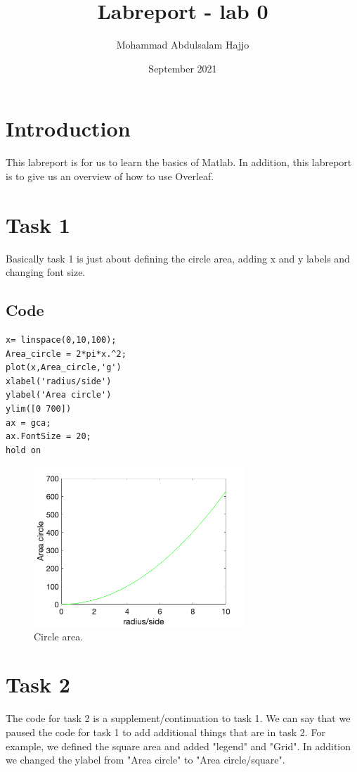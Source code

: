 \documentclass{article}
\title{Labreport - lab 0}
\author{Mohammad Abdulsalam Hajjo}
\affil{Perspectives on Computer Science and Engineering, mohhaj21@student.hh.se}
\date{September 2021}
\begin{document}
\maketitle

\section{Introduction}
This labreport is for us to learn the basics of Matlab. In addition, this labreport is to give us an overview of how to use Overleaf. 

\section{Task 1}
Basically task 1 is just about defining the circle area, adding x and y labels and changing font size. 
\subsection{Code}
\begin{tcolorbox}
\begin{verbatim}
x= linspace(0,10,100);
Area_circle = 2*pi*x.^2;
plot(x,Area_circle,'g')
xlabel('radius/side')
ylabel('Area circle')
ylim([0 700])
ax = gca;
ax.FontSize = 20;
hold on   
\end{verbatim}
\end{tcolorbox} 


\begin{figure}[H]
\centering
\includegraphics[angle=0,width=8cm]{lab-0 figure1.png}
\caption{Circle area.}
\label{fig:circleAndSquareArea}
\end{figure}


\section{Task 2}
The code for task 2 is a supplement/continuation to task 1. We can say that we paused the code for task 1 to add additional things that are in task 2. For example, we defined the square area and added "legend" and "Grid". In addition we changed the ylabel from "Area circle" to "Area circle/square". 
\end{document}
